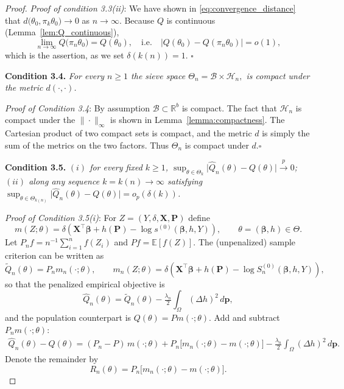 \documentclass[11pt]{article}
\newcommand{\E}{\mathbb{E}}
\newcommand{\R}{\mathbb{R}}
\newenvironment{condition}[1]
  {\par\medskip\noindent\textbf{Condition #1.}\itshape}
  {\medskip}
\begin{document}
\begin{proof}
        
		\noindent\textit{Proof of condition 3.3(ii)}: We have shown in \eqref{eq:convergence_distance} that 
		\(d\bigl(\theta_0,\pi_{k}\theta_0\bigr)\!\to0\) as \(n\to\infty\).
		Because \(Q\) is continuous (Lemma~\ref{lem:Q_continuous}),
		\[
		\lim_{n\to\infty}Q\!\bigl(\pi_n\theta_0\bigr)=Q(\theta_0),
		\quad\text{i.e.}\quad
		\bigl|Q(\theta_0)-Q(\pi_n\theta_0)\bigr|=o(1),
		\]
		which is the assertion, as we set $\delta(k(n)) = 1$.  \hfill $\square$
		
		\begin{condition}{3.4} For every \(n\ge1\) the sieve space
		\(
		\Theta_n = \mathcal B \times \mathcal H_n, 
		\)
		is compact under the metric $d(\cdot, \cdot)$. 
		\end{condition}
		
        
        \noindent \textit{Proof of Condition 3.4}: By assumption \(\mathcal B\subset\R^{b}\) is compact. The fact that $\mathcal{H}_n$ is compact under the $\|\cdot\|_{\infty}$ is shown in Lemma~\ref{lemma:compactness}. The Cartesian product of two compact sets is compact, and the metric \(d\) is simply the sum of the metrics on the two factors. Thus \(\Theta_n\) is compact under \(d\).\hfill $\square$
		
		\begin{condition}{3.5} $(i)$ for every fixed $k\ge1$, $\sup_{\theta\in\Theta_k}\bigl|\hat Q_n(\theta)-Q(\theta)\bigr|\xrightarrow{p}0$; $(ii)$ along any sequence $k=k(n)\to\infty$ satisfying $\displaystyle \sup_{\theta\in\Theta_{k(n)}}\bigl|\hat Q_n(\theta)-Q(\theta)\bigr|=o_p(\delta(k))$.
		\end{condition}

        
		\noindent \textit{Proof of Condition 3.5(i)}: For $Z=(Y,\delta,\bm X,\bm P)$ define
        \[
        m(Z;\theta)
        =\delta\!\left(\bm X^{\!\top}\bm\beta+h(\bm P)-\log s^{(0)}(\bm\beta,h,Y)\right),
        \qquad
        \theta=(\bm\beta,h)\in\Theta .
        \]
        Let $P_nf=n^{-1}\sum_{i=1}^n f(Z_i)$ and $Pf=\E[f(Z)]$.  The (unpenalized) sample criterion can be written as
        \[
        \widetilde Q_n(\theta)=P_n m_n(\cdot;\theta),
        \qquad
        m_n(Z;\theta)
        =\delta\!\left(\bm X^{\!\top}\bm\beta+h(\bm P)-\log S_n^{(0)}(\bm\beta,h,Y)\right),
        \]
        so that the penalized empirical objective is
        \[
        \hat Q_n(\theta)
        =\widetilde Q_n(\theta)-\tfrac{\lambda_n}{2}\!\int_{\Omega}(\Delta h)^2\,d\bm p,
        \]
        and the population counterpart is $Q(\theta)=Pm(\cdot;\theta)$.
        Add and subtract $P_n m(\cdot;\theta)$:
        \begin{align}\label{eq:empirical-decomp}
        \hat Q_n(\theta)-Q(\theta)
        =(P_n-P)\,m(\cdot;\theta)
        +
        P_n\!\big[m_n(\cdot;\theta)-m(\cdot;\theta)\big]
        -\tfrac{\lambda_n}{2}\!\int_{\Omega}(\Delta h)^2\,d\bm p .
        \end{align}
        Denote the remainder by
        \[
        R_n(\theta)
        = P_n\!\big[m_n(\cdot;\theta)-m(\cdot;\theta)\big].
        \]
        

\end{proof}
\end{document}
